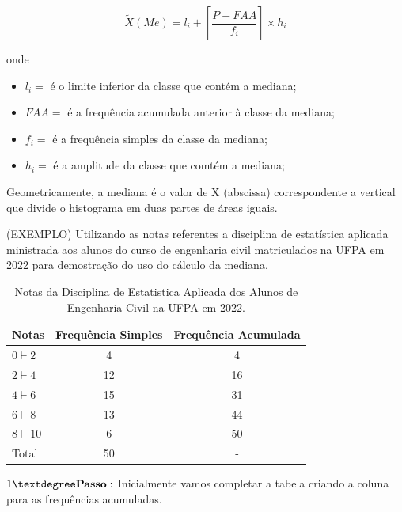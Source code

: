 \begin{equation}\label{}
    \tilde{X}(Me)=l_{i}+\left[\frac{P-FAA}{f_{i}}\right]\times h_{i}
\end{equation}

 onde

 \begin{itemize}
   \item $l_{i}=$ é o limite inferior da classe que contém a mediana;
   \item $FAA=$ é a frequência acumulada anterior à classe da mediana;
   \item $f_{i}=$ é a frequência simples da classe da mediana;
   \item $h_{i}=$ é a amplitude da classe que comtém a mediana;
 \end{itemize}


Geometricamente, a mediana é o valor de X (abscissa) correspondente a vertical que divide o histograma em duas partes de áreas iguais.\vskip0.3cm


(EXEMPLO) Utilizando as notas referentes a disciplina de estatística aplicada ministrada aos alunos do curso de engenharia civil matriculados na UFPA em 2022 para demostração do uso do cálculo da mediana.



  \begin{table}[!htb]
    \centering
    {
    \caption{Notas da Disciplina de Estatistica Aplicada dos Alunos de Engenharia Civil na UFPA em 2022.}
    \label{exemplomediana}
    \vspace{0.1cm}
\begin{tabular}{l|c|c}
  \hline\hline
  Notas          & Frequência Simples & Frequência Acumulada \\
  \hline\hline
  $0 \vdash 2  $ & 4          & 4                    \\
  $2 \vdash 4  $ & 12         & 16                   \\
  $4 \vdash 6  $ & 15         & 31                   \\
  $6 \vdash 8  $ & 13         & 44                   \\
  $8 \vdash 10 $ & 6          & 50                   \\
  \hline\hline
  Total & 50                  &  - \\
    \hline\hline
\end{tabular}}
\end{table}

$1° \mbox{\textbf{Passo}}:$ Inicialmente vamos completar a tabela criando a coluna para as frequências acumuladas.\vskip0.3cm

